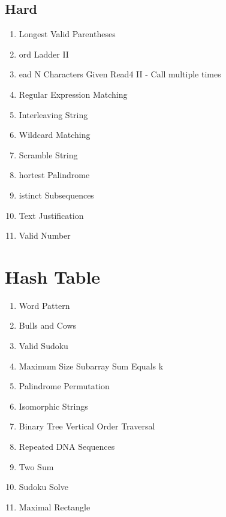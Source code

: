 \documentclass[DIV=calc, paper=a4, fontsize=11pt, twocolumn]{scrartcl}	 %
\begin{document}
\subsection*{Hard}
\begin{enumerate}
\item Longest Valid Parentheses \cite{032}
\item ord Ladder II  \cite{126}
\item ead N Characters Given Read4 II - Call multiple times \cite{158}
\item Regular Expression Matching  \cite{010}
\item Interleaving String  \cite{097}
\item Wildcard Matching  \cite{044}
\item Scramble String  \cite{087}
\item hortest Palindrome  \cite{214}
\item istinct Subsequences  \cite{115}
\item Text Justification \cite{068}
\item Valid Number   \cite{065}
\end{enumerate}


\section*{Hash Table}

\begin{enumerate}
\item Word Pattern \cite{290} 
\item Bulls and Cows \cite{299}
\item Valid Sudoku \cite{036}
\item Maximum Size Subarray Sum Equals k \cite{325}
\item Palindrome Permutation \cite{266}
\item Isomorphic Strings \cite{205}
\item Binary Tree Vertical Order Traversal \cite{314} 
\item Repeated DNA Sequences \cite{187}
\item Two Sum \cite{001}
\item Sudoku Solve \cite{037}
\item Maximal Rectangle \cite{085}
\end{enumerate}


{}

\end{document}
